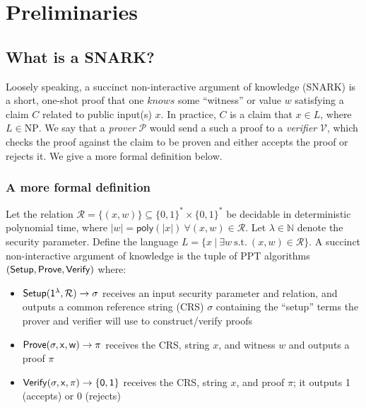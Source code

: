 \section{Preliminaries}

\subsection{What is a SNARK?}
\noindent Loosely speaking, a succinct non-interactive argument of knowledge (SNARK) is a short, one-shot proof that one $knows$ some ``witness'' or value $w$ satisfying a claim $C$ related to public input(s) $x$. In practice, $C$ is a claim that $x \in L$, where $L \in \text{NP}$. We say that a \textit{prover} $\mathcal{P}$ would send a such a proof to a \textit{verifier} $\mathcal{V}$, which checks the proof against the claim to be proven and either accepts the proof or rejects it. We give a more formal definition below.

\subsubsection{A more formal definition}
\noindent Let the relation $\mathcal{R} = \{(x, w)\} \subseteq \{0, 1\}^{*} \times \{0, 1\}^{*}$ be decidable in deterministic polynomial time, where $|w| = \mathsf{poly}(|x|)\ \forall (x, w) \in \mathcal{R}$. Let $\lambda \in \mathbb{N}$ denote the security parameter. Define the language $L = \{x\ |\ \exists w\ \text{s.t.}\ (x, w) \in \mathcal{R}\}$. A succinct non-interactive argument of knowledge is the tuple of PPT algorithms $(\sf{Setup}, \sf{Prove}, \sf{Verify})$ where:
\begin{itemize}
    \item $\sf{Setup}(1^{\lambda}, \mathcal{R}) \rightarrow \sigma$ receives an input security parameter and relation, and outputs a common reference string (CRS) $\sigma$ containing the ``setup'' terms the prover and verifier will use to construct/verify proofs
    \item $\sf{Prove}(\sigma, x, w) \rightarrow \pi$ receives the CRS, string $x$, and witness $w$ and outputs a proof $\pi$
    \item $\sf{Verify}(\sigma, x, \pi) \rightarrow \{0, 1\}$ receives the CRS, string $x$, and proof $\pi$; it outputs 1 (accepts) or 0 (rejects)
\end{itemize}

